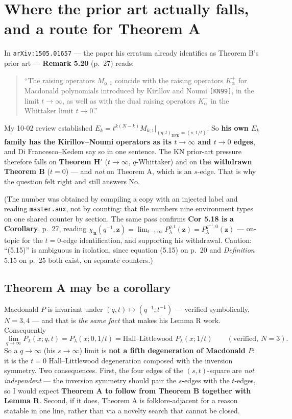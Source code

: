\documentclass[11pt]{article}
\newcommand{\lam}{\lambda}
\begin{document}
\section{Where the prior art actually falls, and a route for Theorem A}
\label{sec:edges}

In \texttt{arXiv:1505.01657} --- the paper his erratum already identifies as Theorem B's prior
art --- \textbf{Remark 5.20} (p.~27) reads:

\begin{quote}
``The raising operators $M_{\alpha,1}$ coincide with the raising operators $K_\alpha^+$ for
Macdonald polynomials introduced by Kirillov and Noumi \texttt{[KN99]}, in the limit
$t\to\infty$, as well as with the dual raising operators $K_\alpha^-$ in the Whittaker limit
$t\to0$.''
\end{quote}

\noindent My 10-02 review established
$E_k=t^{k(N-k)}M_{k;1}|_{(q,t)_{\mathrm{DFK}}=(s,1/t)}$. So \textbf{his own $E_k$ family has
the Kirillov--Noumi operators as its $t\to\infty$ and $t\to0$ edges}, and Di
Francesco--Kedem say so in one sentence. The KN prior-art pressure therefore falls on
\textbf{Theorem H$'$} ($t\to\infty$, $q$-Whittaker) and on \textbf{the withdrawn Theorem B}
($t=0$) --- and \emph{not} on Theorem A, which is an $s$-edge. That is why the question felt
right and still answers No.

(The number was obtained by compiling a copy with an injected label and reading
\texttt{master.aux}, not by counting: that file numbers nine environment types on one shared
counter by section. The same pass confirms \textbf{Cor 5.18 is a Corollary}, p.~27, reading
$\chi_{\mathbf n}(q^{-1},\mathbf z)=\lim_{t\to\infty}P_\lam^{q,t}(\mathbf
z)=P_\lam^{q^{-1},0}(\mathbf z)$ --- on-topic for the $t=0$-edge identification, and
supporting his withdrawal. Caution: ``(5.15)'' is ambiguous in isolation, since equation
(5.15) on p.~20 and \emph{Definition} 5.15 on p.~25 both exist, on separate counters.)

\subsection*{Theorem A may be a corollary}

Macdonald $P$ is invariant under $(q,t)\mapsto(q^{-1},t^{-1})$ --- verified symbolically,
$N=3,4$ --- and that is \emph{the same fact} that makes his Lemma R work. Consequently
\[
\lim_{q\to\infty}P_\lam(x;q,t)=P_\lam(x;0,1/t)=\text{Hall--Littlewood }P_\lam(x;1/t)
\qquad(\text{verified},\ N=3).
\]
So a $q\to\infty$ (his $s\to\infty$) limit is \textbf{not a fifth degeneration of Macdonald
$P$}: it is the $t=0$ Hall--Littlewood degeneration composed with the inversion symmetry. Two
consequences. First, the four edges of the $(s,t)$-square are \emph{not independent} --- the
inversion symmetry should pair the $s$-edges with the $t$-edges, so I would expect
\textbf{Theorem A to follow from Theorem B together with Lemma R}. Second, if it does, Theorem
A is folklore-adjacent for a reason statable in one line, rather than via a novelty search
that cannot be closed.
\end{document}
